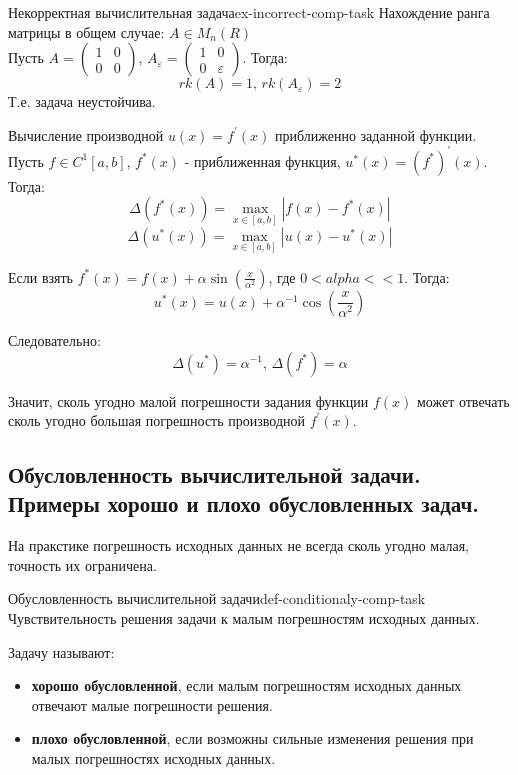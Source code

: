 \documentclass[14pt]{extarticle}
\begin{document}
    \begin{example}{Некорректная вычислительная задача}{ex-incorrect-comp-task}
        Нахождение ранга матрицы в общем случае: $A \in M_{n}(R)$\\
        Пусть $A = \begin{pmatrix} 1 & 0 \\ 0 & 0 \end{pmatrix}$, $A_{\varepsilon} = \begin{pmatrix} 1 & 0 \\ 0 & \varepsilon \end{pmatrix}$. Тогда:
        $$rk(A) = 1 \text{, } rk(A_{\varepsilon}) = 2$$
        Т.е. задача неустойчива.

        \vspace{\baselineskip}

        Вычисление производной $u(x) = f^{'}(x)$ приближенно заданной функции.\\
        Пусть $f \in C^{1}[a, b]$, $f^{*}(x)$ - приближенная функция, $u^{*}(x) = (f^{*})^{'}(x)$. Тогда:
        $$\Delta(f^{*}(x)) = \max_{x \in [a, b]}|f(x) - f^{*}(x)|$$
        $$\Delta(u^{*}(x)) = \max_{x \in [a, b]}|u(x) - u^{*}(x)|$$
        
        Если взять $f^{*}(x) = f(x) + \alpha \sin(\frac{x}{\alpha^{2}})$, где $0 < alpha << 1$. Тогда:
        $$u^{*}(x) = u(x) + \alpha^{-1}\cos(\frac{x}{\alpha^{2}})$$
        
        Следовательно:
        $$\Delta(u^{*}) = \alpha^{-1} \text{, } \Delta(f^{*}) = \alpha$$

        Значит, сколь угодно малой погрешности задания функции $f(x)$ может отвечать сколь угодно большая погрешность производной $f^{'}(x)$.
    \end{example}

\clearpage
\subsection{Обусловленность вычислительной задачи. Примеры хорошо и плохо обусловленных задач.}

    На пракстике погрешность исходных данных не всегда сколь угодно малая, точность их ограничена.

    \begin{definition}{Обусловленность вычислительной задачи}{def-conditionaly-comp-task}
        Чувствительность решения задачи к малым погрешностям исходных данных.

        \vspace{\baselineskip}

        Задачу называют: 
        \begin{itemize}
            \item \textbf{хорошо обусловленной}, если малым погрешностям исходных данных отвечают малые погрешности решения. 
            \item \textbf{плохо обусловленной}, если возможны сильные изменения решения при малых погрешностях исходных данных.
        \end{itemize}
    \end{definition}
\end{document}
